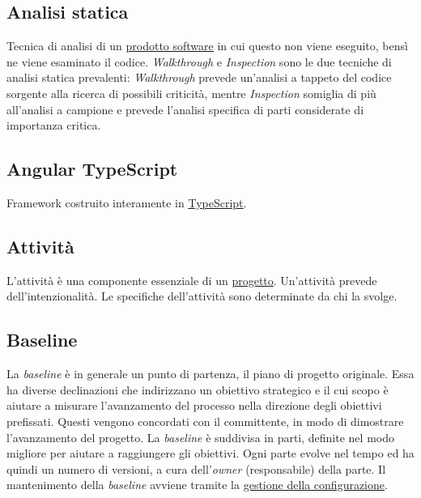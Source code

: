 	\subsection{Analisi statica}
	\label{sec:analisistatica}
	Tecnica di analisi di un \underline{\hyperref[sec:prodottosoftware]{prodotto software}} in cui questo non viene eseguito, bensì ne viene esaminato il codice.
	\emph{Walkthrough} e \emph{Inspection} sono le due tecniche di analisi statica prevalenti: \emph{Walkthrough} prevede un'analisi a tappeto del codice sorgente alla ricerca di possibili criticità, mentre \emph{Inspection} somiglia di più all'analisi a campione e prevede l'analisi specifica di parti considerate di importanza critica.


	\subsection{Angular TypeScript}
	\label{sec:angulartypescript}
	Framework costruito interamente in \underline{\hyperref[sec:typescript]{TypeScript}}.

	\subsection{Attività}
	\label{sec:attivita}
	L'attività è una componente essenziale di un \underline{\hyperref[sec:progetto]{progetto}}. Un'attività prevede dell'intenzionalità. Le specifiche dell'attività sono determinate da chi la svolge.

	\newpage

	\subsection{Baseline}
	\label{sec:baseline}
	La \emph{baseline} è in generale un punto di partenza, il piano di progetto originale. Essa ha diverse declinazioni che indirizzano un obiettivo strategico e il cui scopo è aiutare a misurare l'avanzamento del processo nella direzione degli obiettivi prefissati. Questi vengono concordati con il committente, in modo di dimostrare l'avanzamento del progetto. La  \emph{baseline} è suddivisa in parti, definite nel modo migliore per aiutare a raggiungere gli obiettivi. Ogni parte evolve nel tempo ed ha quindi un numero di versioni, a cura dell'\emph{owner} (responsabile) della parte. Il mantenimento della  \emph{baseline} avviene tramite la \underline{\hyperref[sec:controlloconfigurazione]{gestione della configurazione}}.


